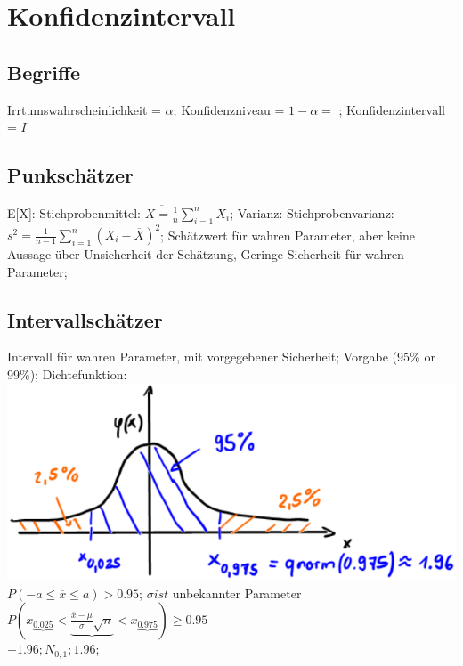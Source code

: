\section{Konfidenzintervall}
  \subsection{Begriffe}
   Irrtumswahrscheinlichkeit = $ \alpha $; 
  Konfidenzniveau =  $ 1-\alpha = $ ; 
  Konfidenzintervall = $ I $
  \subsection{Punkschätzer}
  E[X]: Stichprobenmittel:
  $ \overline{X = \frac{1}{n}} \sum_{i=1}^{n} X_{i}$; 
  Varianz: Stichprobenvarianz:
  $ s^{2} = \frac{1}{n -1} \sum_{i=1}^{n} (X_{i} - \overline{X})^{2} $; 
  Schätzwert für wahren Parameter, aber keine Aussage über Unsicherheit der Schätzung, Geringe Sicherheit für wahren Parameter; 
  
  \subsection{Intervallschätzer}
  Intervall für wahren Parameter, mit vorgegebener Sicherheit; Vorgabe (95\% or 99\%); 
  Dichtefunktion:
  \includegraphics[scale=0.25]{./pic/KonfidenzintervallDichtefunktion.png}
  $ P(-a \le \overline{x} \le a) > 0.95 $; 
  $ \sigma ist $ unbekannter Parameter\\
  $ P( x_{\underbrace{0.025}} < \underbrace{ \frac{\overline{x} - \mu}{\sigma}\sqrt{n} } < x_{\underbrace{0.975}} ) \ge 0.95 $\\
  $ -1.96; N_{0,1}; 1.96 $; 
  
